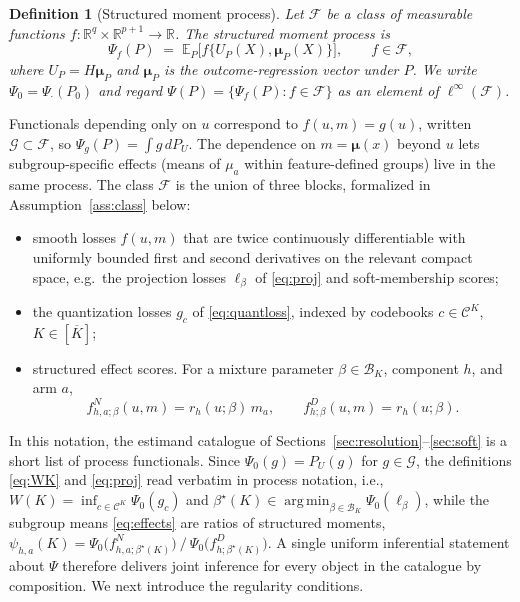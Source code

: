 \documentclass[11pt]{article}
\newtheorem{definition}{Definition}
\newcommand{\E}{\mathbb E}
\newcommand{\R}{\mathbb R}
\DeclareMathOperator*{\argmin}{arg\,min}
\newcommand{\calB}{\mathcal B}
\newcommand{\calC}{\mathcal C}
\newcommand{\calF}{\mathcal F}
\newcommand{\calG}{\mathcal G}
\newcommand{\bmu}{\bm\mu}
\begin{document}
\begin{definition}[Structured moment process]\label{def:process}
Let $\calF$ be a class of measurable functions $f:\R^q\times\R^{p+1}\to\R$. The structured moment process is
\begin{equation}\label{eq:process}
\Psi_f(P)\;=\;\E_P\bigl[f\{U_P(X),\bmu_P(X)\}\bigr],\qquad f\in\calF,
\end{equation}
where $U_P=H\bmu_P$ and $\bmu_P$ is the outcome-regression vector under $P$. We write $\Psi_0=\Psi_\cdot(P_0)$ and regard $\Psi(P)=\{\Psi_f(P):f\in\calF\}$ as an element of $\ell^\infty(\calF)$.
\end{definition}

Functionals depending only on $u$ correspond to $f(u,m)=g(u)$, written $\calG\subset\calF$, so $\Psi_g(P)=\int g\,dP_U$. The dependence on $m=\bmu(x)$ beyond $u$ lets subgroup-specific effects (means of $\mu_a$ within feature-defined groups) live in the same process. The class $\calF$ is the union of three blocks, formalized in Assumption~\ref{ass:class} below:
\begin{itemize}[leftmargin=2em]
\item[$\calF_{\mathrm{sm}}$:] smooth losses $f(u,m)$ that are twice continuously differentiable with uniformly bounded first and second derivatives on the relevant compact space, e.g.\ the projection losses $\ell_\beta$ of \eqref{eq:proj} and soft-membership scores;
\item[$\calF_{\mathrm{qt}}$:] the quantization losses $g_c$ of \eqref{eq:quantloss}, indexed by codebooks $c\in\calC^K$, $K\in[\overline K]$;
\item[$\calF_{\mathrm{str}}$:] structured effect scores. For a mixture parameter $\beta\in\calB_K$, component $h$, and arm $a$,
\begin{equation}\label{eq:effectscores}
f^{N}_{h,a;\beta}(u,m)=r_h(u;\beta)\,m_a,
\qquad
f^{D}_{h;\beta}(u,m)=r_h(u;\beta).
\end{equation}
\end{itemize}
In this notation, the estimand catalogue of Sections~\ref{sec:resolution}--\ref{sec:soft} is a short list of process functionals. Since $\Psi_0(g)=P_U(g)$ for $g\in\calG$, the definitions \eqref{eq:WK} and \eqref{eq:proj} read verbatim in process notation, i.e., $W(K)=\inf_{c\in\calC^K}\Psi_0(g_c)$
and $\beta^\star(K)\in\argmin_{\beta\in\calB_K}\Psi_0(\ell_\beta)$, while the subgroup means \eqref{eq:effects} are ratios of structured moments, $\psi_{h,a}(K) = \Psi_0\bigl(f^N_{h,a;\beta^\star(K)}\bigr) \:/\: \Psi_0\bigl(f^D_{h;\beta^\star(K)}\bigr)$.
A single uniform inferential statement about $\Psi$ therefore delivers joint inference for every object in the catalogue by composition. We next introduce the regularity conditions.
\end{document}
